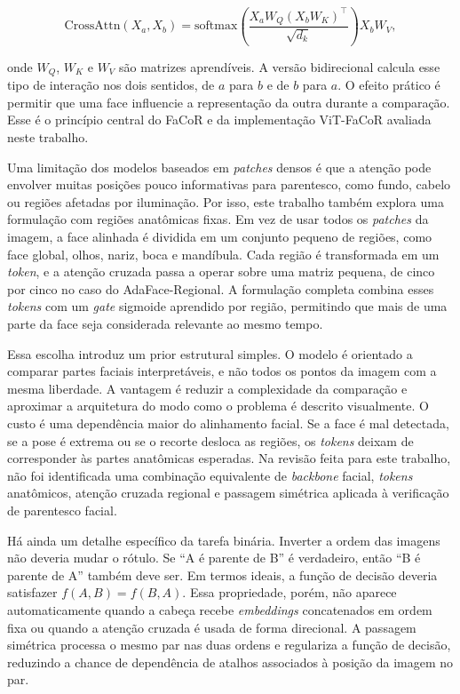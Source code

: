 \begin{equation}
\text{CrossAttn}(X_a, X_b) = \mathrm{softmax}\!\left( \frac{X_a W_Q (X_b W_K)^\top}{\sqrt{d_k}} \right) X_b W_V,
\label{eq:cross_attention}
\end{equation}

onde $W_Q$, $W_K$ e $W_V$ são matrizes aprendíveis. A versão bidirecional calcula esse tipo de interação nos dois sentidos, de $a$ para $b$ e de $b$ para $a$. O efeito prático é permitir que uma face influencie a representação da outra durante a comparação. Esse é o princípio central do FaCoR \cite{su2023facornet} e da implementação ViT-FaCoR avaliada neste trabalho.

Uma limitação dos modelos baseados em \textit{patches} densos é que a atenção pode envolver muitas posições pouco informativas para parentesco, como fundo, cabelo ou regiões afetadas por iluminação. Por isso, este trabalho também explora uma formulação com regiões anatômicas fixas. Em vez de usar todos os \textit{patches} da imagem, a face alinhada é dividida em um conjunto pequeno de regiões, como face global, olhos, nariz, boca e mandíbula. Cada região é transformada em um \textit{token}, e a atenção cruzada passa a operar sobre uma matriz pequena, de cinco por cinco no caso do AdaFace-Regional. A formulação completa combina esses \textit{tokens} com um \textit{gate} sigmoide aprendido por região, permitindo que mais de uma parte da face seja considerada relevante ao mesmo tempo.

Essa escolha introduz um prior estrutural simples. O modelo é orientado a comparar partes faciais interpretáveis, e não todos os pontos da imagem com a mesma liberdade. A vantagem é reduzir a complexidade da comparação e aproximar a arquitetura do modo como o problema é descrito visualmente. O custo é uma dependência maior do alinhamento facial. Se a face é mal detectada, se a pose é extrema ou se o recorte desloca as regiões, os \textit{tokens} deixam de corresponder às partes anatômicas esperadas. Na revisão feita para este trabalho, não foi identificada uma combinação equivalente de \textit{backbone} facial, \textit{tokens} anatômicos, atenção cruzada regional e passagem simétrica aplicada à verificação de parentesco facial.

Há ainda um detalhe específico da tarefa binária. Inverter a ordem das imagens não deveria mudar o rótulo. Se ``A é parente de B'' é verdadeiro, então ``B é parente de A'' também deve ser. Em termos ideais, a função de decisão deveria satisfazer $f(A,B) = f(B,A)$. Essa propriedade, porém, não aparece automaticamente quando a cabeça recebe \textit{embeddings} concatenados em ordem fixa ou quando a atenção cruzada é usada de forma direcional. A passagem simétrica processa o mesmo par nas duas ordens e regulariza a função de decisão, reduzindo a chance de dependência de atalhos associados à posição da imagem no par.

